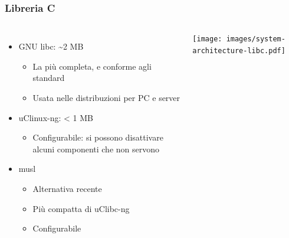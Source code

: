 \documentclass[xetex,table]{beamer}
\begin{document}
\begin{frame}
\frametitle{Libreria C}
  \begin{columns}
    \begin{itemize}
      \item GNU libc: \textasciitilde 2 MB
      \begin{itemize}
        \item La più completa, e conforme agli standard
        \item Usata nelle distribuzioni per PC e server
      \end{itemize}
      \item uClinux-ng: < 1 MB
      \begin{itemize}
        \item Configurabile: si possono disattivare alcuni componenti
          che non servono
      \end{itemize}
      \item musl
      \begin{itemize}
        \item Alternativa recente
        \item Più compatta di uClibc-ng
        \item Configurabile
      \end{itemize}
    \end{itemize}
    \texttt{[image: images/system-architecture-libc.pdf]}
  \end{columns}
\end{frame}
\end{document}
